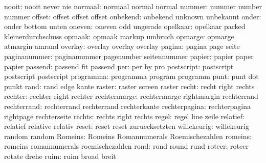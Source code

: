              nooit:  nooit                never               nie
            normaal:  normaal              normal              normal
             nummer:  nummer               number              nummer
             offset:  offset               offset              offset
           onbekend:  onbekend             unknown             unbekannt
              onder:  onder                bottom              unten
             oneven:  oneven               odd                 ungerade
           opelkaar:  opelkaar             packed              kleinerdurchschuss
             opmaak:  opmaak               markup              umbruch
            opmarge:  opmarge              atmargin            amrand
            overlay:  overlay              overlay             overlay
             pagina:  pagina               page                seite
       paginanummer:  paginanummer         pagenumber          seitennummer
             papier:  papier               paper               papier     %
            passend:  passend              fit                 passend
                per:  per                  by                  pro
         postscript:  postscript           postscript          postscript
          programma:  programma            program             programm
               punt:  punt                 dot                 punkt
               rand:  rand                 edge                kante
             raster:  raster               screen              raster
              recht:  recht                right               rechts
            rechter:  rechter              right               rechter
       rechtermarge:  rechtermarge         rightmargin         rechterrand
        rechterrand:  rechterrand          rechterrand         rechterkante
      rechterpagina:  rechterpagina        rightpage           rechterseite
             rechts:  rechts               right               rechts
              regel:  regel                line                zeile
           relatief:  relatief             relative            relativ
              reset:  reset                reset               zuruecksetzten
        willekeurig:  willekeurig          random              random %
            Romeins:  Romeins              Romannumerals       Roemischezahlen
            romeins:  romeins              romannumerals       roemischezahlen
               rond:  rond                 round               rund
             roteer:  roteer               rotate              drehe
               ruim:  ruim                 broad               breit
